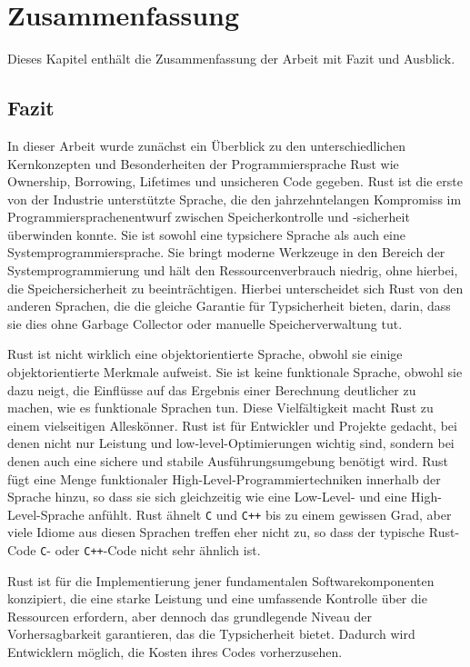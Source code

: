 \chapter{Zusammenfassung}

\nocite{*}

Dieses Kapitel enthält die Zusammenfassung der Arbeit mit Fazit und Ausblick.

\section{Fazit}

In dieser Arbeit wurde zunächst ein Überblick zu den unterschiedlichen Kernkonzepten und Besonderheiten der Programmiersprache Rust wie Ownership, Borrowing, Lifetimes und unsicheren Code gegeben. Rust ist die erste von der Industrie unterstützte Sprache, die den jahrzehntelangen Kompromiss im Programmiersprachenentwurf zwischen Speicherkontrolle und -sicherheit überwinden konnte. Sie ist sowohl eine typsichere Sprache als auch eine Systemprogrammiersprache. Sie bringt moderne Werkzeuge in den Bereich der Systemprogrammierung und hält den Ressourcenverbrauch niedrig, ohne hierbei, die Speichersicherheit zu beeinträchtigen.\autocite{rust-whitepaper-npm} Hierbei unterscheidet sich Rust von den anderen Sprachen, die die gleiche Garantie für Typsicherheit bieten, darin, dass sie dies ohne Garbage Collector oder manuelle Speicherverwaltung tut. 

Rust ist nicht wirklich eine objektorientierte Sprache, obwohl sie einige objektorientierte Merkmale aufweist. Sie ist keine funktionale Sprache, obwohl sie dazu neigt, die Einflüsse auf das Ergebnis einer Berechnung deutlicher zu machen, wie es funktionale Sprachen tun. Diese Vielfältigkeit macht Rust zu einem vielseitigen Alleskönner. 
Rust ist für Entwickler und Projekte gedacht, bei denen nicht nur Leistung und low-level-Optimierungen wichtig sind, sondern bei denen auch eine sichere und stabile Ausführungsumgebung benötigt wird. Rust fügt eine Menge funktionaler High-Level-Programmiertechniken innerhalb der Sprache hinzu, so dass sie sich gleichzeitig wie eine Low-Level- und eine High-Level-Sprache anfühlt. Rust ähnelt \texttt{C} und \texttt{C++} bis zu einem gewissen Grad, aber viele Idiome aus diesen Sprachen treffen eher nicht zu, so dass der typische Rust-Code \texttt{C}- oder \texttt{C++}-Code nicht sehr ähnlich ist. 

Rust ist für die Implementierung jener fundamentalen Softwarekomponenten konzipiert, die eine starke Leistung und eine umfassende Kontrolle über die Ressourcen erfordern, aber dennoch das grundlegende Niveau der Vorhersagbarkeit garantieren, das die Typsicherheit bietet. Dadurch wird Entwicklern möglich, die Kosten ihres Codes vorherzusehen.

